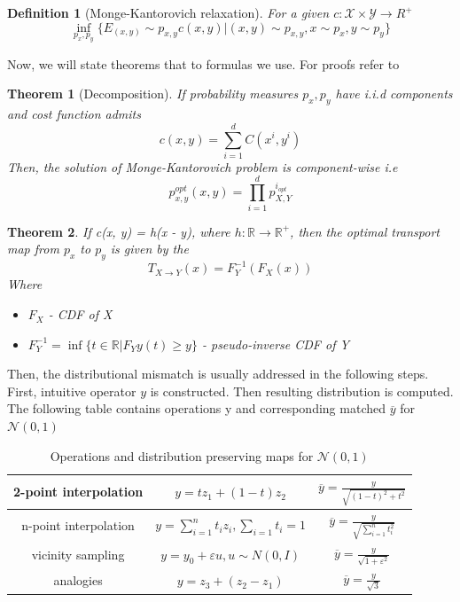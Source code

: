 \documentclass{article}
\newtheorem{definition}{Definition}
\newtheorem{theorem}{Theorem}
\begin{document}
\begin{definition}[Monge-Kantorovich relaxation]
For a given  $c:\mathcal{X} \times \mathcal{Y} \rightarrow R^+$
$$
\inf_{p_x, p_y} \{E_{(x, y)}\sim p_{x, y} c(x, y) | (x, y) \sim p_{x, y}, x \sim p_x , y\sim p_y\}
$$
\end{definition}
Now, we will state theorems that to formulas we use. For proofs refer to \cite{main}
\begin{theorem}[Decomposition]
If probability measures $p_x, p_y$ have i.i.d components and cost function admits
$$
c(x, y) = \sum_{i=1}^{d}C(x^{i}, y^{i})
$$
Then, the solution of Monge-Kantorovich problem is component-wise i.e
$$
p^{opt}_{x, y}(x, y) = \prod_{i=1}^{d} p^{i_{opt}}_{X, Y}
$$
\end{theorem}

\begin{theorem}
If c(x, y) = h(x - y), where $h: \mathbb{R} \rightarrow \mathbb{R^+}$, then the optimal transport map from $p_x$ to $p_y$ is given by the 
$$
T_{X \rightarrow Y}(x) = F^{-1}_Y(F_X(x))
$$
Where 
\begin{itemize}
    \item $F_X$ - CDF of X
    \item $F^{-1}_Y = \inf \{ t \in \mathbb{R} | F_Y{y}(t) \ge y \}$ - pseudo-inverse CDF of Y
\end{itemize}
\end{theorem}

Then, the distributional mismatch is usually addressed in the following
steps. First, intuitive operator $y$ is constructed. Then resulting distribution is computed. 
The following table contains operations y and corresponding matched $\overline{y}$ for $\mathcal{N}(0, 1)$
\begin{table}[!h]
    \centering
    \begin{tabular}{|c|c|c|}
    \hline
        2-point interpolation & $y = tz_1 + (1 - t)z_2$ & $\overline{y} = \frac{y}{\sqrt{(1 - t)^2 + t^2}}$  \\
        \hline
        n-point interpolation & $y = \sum_{i=1}^{n}t_i z_i, \sum_{i=1}t_i=1$ 
         & $\overline{y} = \frac{y}{\sqrt{\sum_{i=1}^{n}t_i^2}}$ \\
         \hline
         vicinity sampling & $y = y_0 + \varepsilon u, u \sim N(0, I)$ & $\overline{y} = \frac{y}{\sqrt{1 + \varepsilon^2}}$ \\
         \hline
         analogies & $y = z_3 + (z_2 - z_1)$ & $\overline{y} = \frac{y}{\sqrt{3}}$ \\
         \hline
    \end{tabular}
    \caption{Operations and distribution preserving maps for $\mathcal{N}(0, 1)$}
    \label{tab:my_label_1}
\end{table}
\end{document}
